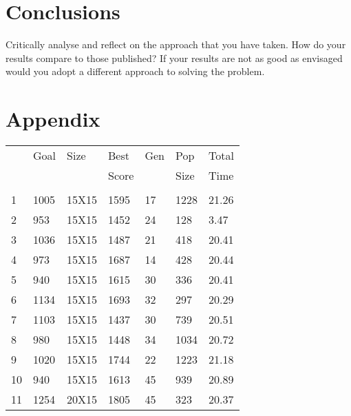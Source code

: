 \documentclass[14pt]{acmsiggraph}
\begin{document}
	\section{Conclusions}
	Critically analyse and reflect on the approach that you have taken. How do your results compare to those published? If your results are not as good as envisaged would you adopt a different approach to solving the problem.
	
	
	
	
	
	\section{Appendix}
	\onecolumn
	\clearpage
	\begin{table}[h!]
		\footnotesize	
		\vspace{5pt}
		\begin{center}
			\subtable
			{
				\begin{tabular}{lllllll||}
					 & Goal   & Size   & Best & Gen & Pop & Total \\ 
					 &  &    & Score &   &  Size & Time \\ \hline \\
					1   & 1005 & 15X15  & \cellcolor[rgb]{1,0.76,0.43}1595    & 17  & 1228 & 21.26 \\
					2   & 953  & 15X15  & \cellcolor[rgb]{1,0.87,0.49}1452    & 24  & 128  & 3.47  \\
					3   & 1036 & 15X15  & \cellcolor[rgb]{0.92,0.88,0.48}1487 & 21  & 418  & 20.41 \\
					4   & 973  & 15X15  & \cellcolor[rgb]{1,0.49,0.27}1687    & 14  & 428  & 20.44 \\
					5   & 940  & 15X15  & \cellcolor[rgb]{1,0.52,0.29}1615    & 30  & 336  & 20.41 \\
					6   & 1134 & 15X15  & \cellcolor[rgb]{0.98,0.91,0.51}1693 & 32  & 297  & 20.29 \\
					7   & 1103 & 15X15  & \cellcolor[rgb]{0.77,0.82,0.41}1437 & 30  & 739  & 20.51 \\
					8   & 980  & 15X15  & \cellcolor[rgb]{0.97,0.9,0.5}1448   & 34  & 1034 & 20.72 \\
					9   & 1020 & 15X15  & \cellcolor[rgb]{1,0.53,0.3}1744     & 22  & 1223 & 21.18 \\
					10  & 940  & 15X15  & \cellcolor[rgb]{1,0.52,0.29}1613    & 45  & 939  & 20.89 \\
					11  & 1254 & 20X15  & \cellcolor[rgb]{0.92,0.89,0.48}1805 & 45  & 323  & 20.37 \\

\end{tabular}}
\end{center}
\end{table}
\end{document}
